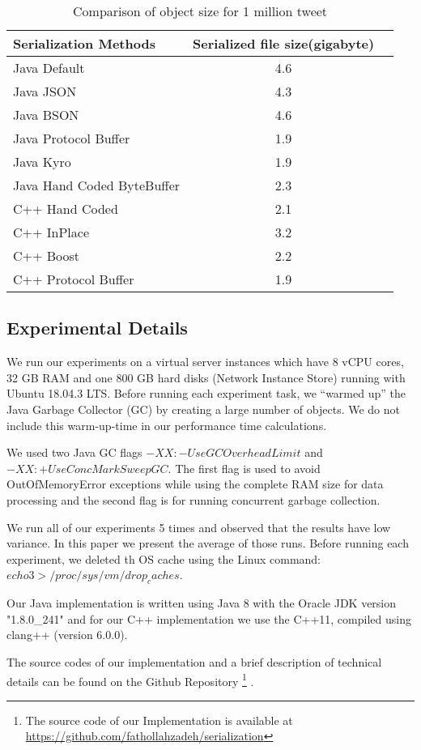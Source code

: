 \begin{table}
	\centering
	\caption{Comparison of object size for 1 million tweet }
	\label{tbl:object_size}
	\begin{adjustbox}{width=\columnwidth,center}	
		
		\begin{tabular}{|l|c|c|} \hline
		 \textbf{Serialization Methods} & \textbf{Serialized file size(gigabyte)}\\ \hline
			Java Default  & 4.6 \\ \hline	
			Java JSON  & 4.3 \\ \hline	
			Java BSON  & 4.6 \\ \hline	
			Java Protocol Buffer  & 1.9 \\ \hline	
			Java Kyro  & 1.9 \\ \hline	
			Java Hand Coded ByteBuffer  & 2.3 \\ \hline	
			C++ Hand Coded  & 2.1 \\ \hline	
			C++ InPlace  & 3.2 \\ \hline	
			C++ Boost  & 2.2 \\ \hline	
			C++ Protocol Buffer  & 1.9 \\ \hline					
			\hline\end{tabular}
	\end{adjustbox}
\end{table}


\subsection{Experimental Details}
We run our experiments on a virtual server instances which have 8 vCPU cores, 32 GB RAM and one 800
GB hard disks (Network Instance Store) running with Ubuntu 18.04.3 LTS. Before running each experiment task, we “warmed up” the Java Garbage Collector (GC) by creating a large number of objects. We do not include this warm-up-time in our performance time calculations.

We used two Java GC flags $-XX:-UseGCOverheadLimit$ and $-XX:+UseConcMarkSweepGC$. The first flag is used to avoid OutOfMemoryError exceptions while using the complete RAM size for data processing and the second flag is for running concurrent garbage collection.

We run all of our experiments 5 times and observed that the results have low variance. In this paper we present the average of those runs. Before running each experiment, we
deleted th OS cache using the Linux command: $echo 3 > /proc/sys/vm/drop_caches$.

Our Java implementation is written using Java 8 with the Oracle JDK version "1.8.0\_241" and for our C++ implementation we use the C++11, compiled using clang++ (version 6.0.0).

The source codes of our implementation and a brief description of technical details can be found on the Github Repository \footnote{The source code of our Implementation is available at \url{https://github.com/fathollahzadeh/serialization}} .
